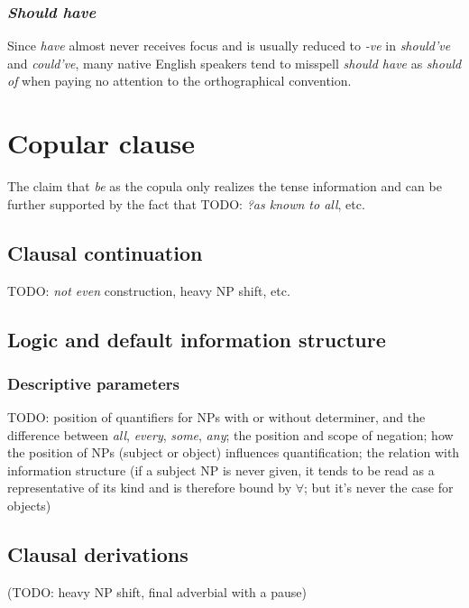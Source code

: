 \documentclass[UTF8, a4paper, oneside, scheme=plain, 12pt]{ctexbook}
\newcommand{\form}[1]{\emph{#1}}
\begin{document}
\subsubsection{\form{Should have}}

Since \form{have} almost never receives focus
and is usually reduced to \form{-ve} in \form{should've} and \form{could've},
many native English speakers 
tend to misspell \form{should have} as \form{should of}
when paying no attention to the orthographical convention.

\section{Copular clause}

The claim that \form{be} as the copula only realizes the tense information 
and can be further supported by the fact 
that TODO: \form{?as known to all}, etc.

\subsection{Clausal continuation}

TODO: \form{not even} construction, heavy NP shift, etc.


\subsection{Logic and default information structure}

\subsubsection{Descriptive parameters}

TODO: position of quantifiers for NPs with or without determiner,
and the difference between \form{all}, \form{every}, \form{some}, \form{any};
the position and scope of negation;
how the position of NPs (subject or object) influences quantification;
the relation with information structure
(if a subject NP is never given, 
it tends to be read as a representative of its kind and is therefore bound by $\forall$;
but it's never the case for objects)

\subsection{Clausal derivations}\label{sec:simple-clause.derivation}

(TODO: heavy NP shift, final adverbial with a pause)
\end{document}
